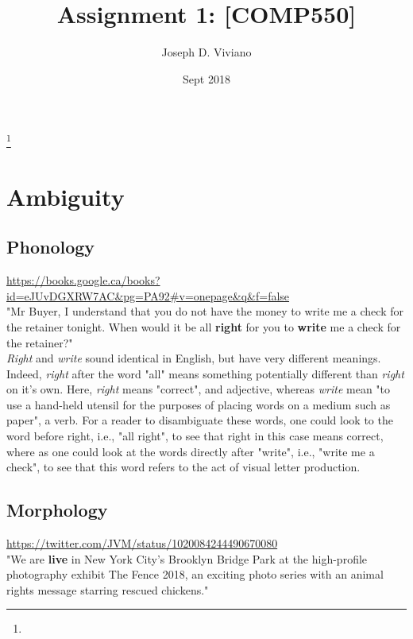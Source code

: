 \documentclass{amsart}
\theoremstyle{definition}
\theoremstyle{remark}
\numberwithin{equation}{section}
\begin{document}
\title{Assignment 1: [COMP550]}

\author{Joseph D. Viviano}
\address{McGill University}
\curraddr{}
\thanks{}
\date{Sept 2018}

\maketitle

\section{Ambiguity}

\subsection{Phonology}

\url{https://books.google.ca/books?id=eJUvDGXRW7AC&pg=PA92#v=onepage&q&f=false} \\

"Mr Buyer, I understand that you do not have the money to write me a check for
the retainer tonight. When would it be all \textbf{right} for you to
\textbf{write} me a check for the retainer?" \\

\textit{Right} and \textit{write} sound identical in English, but have very
different meanings. Indeed, \textit{right} after the word "all" means something
potentially different than \textit{right} on it's own. Here, \textit{right}
means "correct", and adjective, whereas \textit{write} mean "to use a hand-held
utensil  for the purposes of placing words on a medium such as paper", a verb.
For a  reader to disambiguate these words, one could look to the word before
right,  i.e., "all right", to see that right in this case means correct, where
as one  could look at the words directly after "write", i.e., "write me a
check", to see  that this word refers to the act of visual letter production. \\

\subsection{Morphology}

\url{https://twitter.com/JVM/status/1020084244490670080} \\

"We are \textbf{live} in New York City’s Brooklyn Bridge Park at the high-profile photography exhibit The Fence 2018, an exciting photo series with an animal rights message starring rescued chickens." \\
\end{document}
